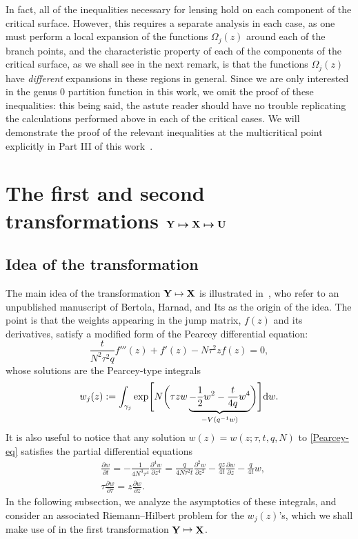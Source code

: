 \documentclass[10pt,a4paper]{amsart}
\DeclareMathOperator{\YY}{{\bf Y}}
\DeclareMathOperator{\XX}{{\bf X}}
\numberwithin{equation}{section}
\begin{document}
\fi

\begin{Remark} In fact, all of the inequalities necessary for lensing hold on each
component of the critical surface. However, this requires a separate analysis in each case, as one must perform a local expansion
of the functions $\Omega_j(z)$ around each of the branch points, and the characteristic property of each of the components of the
critical surface, as we shall see in the next remark, is that the functions $\Omega_j(z)$ have \textit{different} expansions in these
regions in general. Since we are only interested in the genus $0$ partition function in this work, we omit the proof of these inequalities: this being said, the astute reader should have no trouble replicating the calculations performed above in each of the critical cases. We will demonstrate the proof of the relevant inequalities at the multicritical point explicitly in Part III of this work~\cite{DHL3}.
\end{Remark}

\section[The first and second transformations ${\bf Y} \mapsto {\bf X} \mapsto {\bf U}$]{The first and second transformations $\boldsymbol{{\bf Y} \mapsto {\bf X} \mapsto {\bf U}}$}\label{section4}

\subsection{Idea of the transformation}
The main idea of the transformation ${\bf Y} \mapsto {\bf X}$ is illustrated in~\cite{DK1}, who refer to an unpublished manuscript of Bertola, Harnad, and Its
as the origin of the idea. The point is that the weights appearing in the jump matrix, $f(z)$ and its derivatives, satisfy a modified form of the Pearcey differential equation:
 \begin{equation} \label{Pearcey-eq}
 \frac{t}{N^2\tau^2 q} f'''(z) + f'(z) - N\tau^2 z f(z) = 0,
 \end{equation}
whose solutions are the Pearcey-type integrals
 \begin{equation*}
 w_j(z) := \int_{\gamma_j} \exp\Biggl[ N\biggl(\tau z w \underbrace{-\frac{1}{2}w^2 - \frac{t}{4q}w^4}_{-V(q^{-1}w)} \biggr)\Biggr] {\rm d}w.
 \end{equation*}
It is also useful to notice that any solution $w(z) = w(z;\tau,t,q,N)$ to \eqref{Pearcey-eq} satisfies the partial differential equations
 \begin{align*}
 &\frac{\partial w}{\partial t}= -\frac{1}{4 N^3\tau^4} \frac{\partial^4 w}{\partial z^4} = \frac{q}{4N\tau^2 t} \frac{\partial^2 w }{\partial z^2} - \frac{qz}{4t}\frac{\partial w }{\partial z} - \frac{q}{4t} w,\\
 &\tau\frac{\partial w}{\partial \tau}= z\frac{\partial w}{\partial z}.
 \end{align*}
In the following subsection, we analyze the asymptotics of these integrals, and consider an associated Riemann--Hilbert problem for the $w_j(z)$'s, which we shall make use of in the first transformation $\YY \mapsto \XX$.
\end{document}

